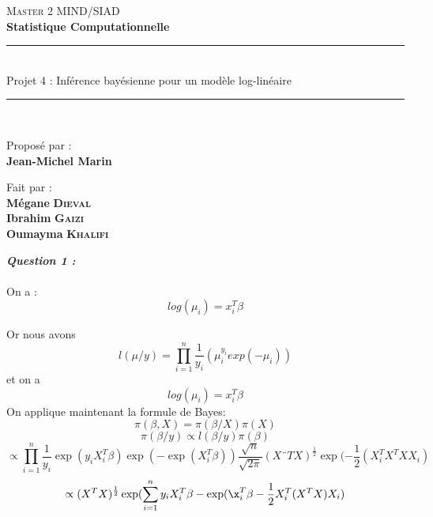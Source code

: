 \documentclass[french,12pt]{report}
\newcommand{\<}{\langle}
\renewcommand{\>}{\rangle}
\theoremstyle{definition}
\begin{document}
\begin{titlepage}
\vspace{4cm}

\center
\textsc{\LARGE Master 2 MIND/SIAD}\\
\vspace{1cm}
\textrm{\textbf{Statistique Computationnelle}}

\rule{\linewidth}{1pt}\\[0.4cm]

\huge {Projet 4 : Inférence bayésienne pour un modèle log-linéaire }
\rule{\linewidth}{1pt}\\[0.5cm]

 
 




\vspace{1cm}

\Large Proposé par : \\[0.5cm]

\LARGE \textbf{Jean-Michel Marin}\\






     




 
\vspace{1cm}

\Large Fait par : \\[0.9cm]


\LARGE \textbf{Mégane} \textsc{ \textbf{Dieval}}\\  
\vspace{0.5cm}
\LARGE \textbf{Ibrahim} \textsc{ \textbf{Gaizi}}\\
\vspace{0.5cm}
\LARGE \textbf{Oumayma} \textsc{ \textbf{Khalifi}}\\     


  

\centering




     




\end{titlepage}






\textbf{\textit{Question 1 : }} \\ \\

On a : $$ log(\mu_i)=x_i^T\beta$$

Or nous avons $$l(\mu/y)=\prod_{i=1}^n \frac{1}{y_i}(\mu_i^{y_i}exp(-\mu_i)) $$ 
et on a $$ log(\mu_i)=x_i^T\beta$$
On applique maintenant la formule de Bayes: 
$$\pi(\beta,X) = \pi(\beta/X)\pi(X)$$
$$\pi(\beta/y) \propto l(\beta/y)\pi(\beta) $$
$$\propto \prod_{i=1}^n \frac{1}{y_i} \exp(y_i X_i^T\beta)\exp(-\exp(X_i^T\beta))\frac{\sqrt{n}}{\sqrt{2\pi}} (X¨TX)^{\frac{1}{2}} \exp(-\frac{1}{2}(X_i^TX^TXX_i) $$
$$\propto (X^TX)^{\frac{1}{2}}\exp(\sum_{i=1}^n y_i X_i^T\beta-\exp(\x_i^T\beta-\frac{1}{2}X_i^T(X^TX)X_i)$$
\end{document}
